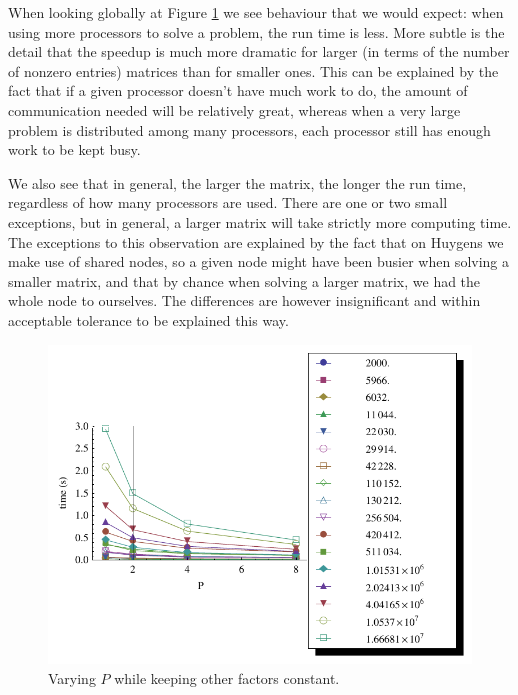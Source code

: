 \documentclass[a4paper]{article}
\newcommand{\legendplotsize}{1.3\textwidth}
\begin{document}
When looking globally at Figure \ref{fig:time-run} we see behaviour that we would expect: when
using more processors to solve a problem, the run time is less. More subtle is the detail that the
speedup is much more dramatic for larger (in terms of the number of nonzero entries) matrices than for smaller
ones. This can be explained by the fact that if a given processor doesn't have much work to do, the
amount of communication needed will be relatively great, whereas when a very large problem is distributed among
many processors, each processor still has enough work to be kept busy.

We also see that in general, the larger the matrix, the longer the run time, regardless of how many processors
are used. There are one or two small exceptions, but in general, a larger matrix will take strictly more computing
time. The exceptions to this observation are explained by the fact that on Huygens we make use of
shared nodes, so a given node might have been busier when solving a smaller matrix, and that by chance when
solving a larger matrix, we had the whole node to ourselves. The differences are however insignificant and
within acceptable tolerance to be explained this way.

\begin{figure}[h]
    \begin{center}
        \includegraphics[width=\legendplotsize]{img/time-run.pdf}
    \end{center}
    \caption{Varying $P$ while keeping other factors constant.}
    \label{fig:time-run}
\end{figure}
\end{document}
